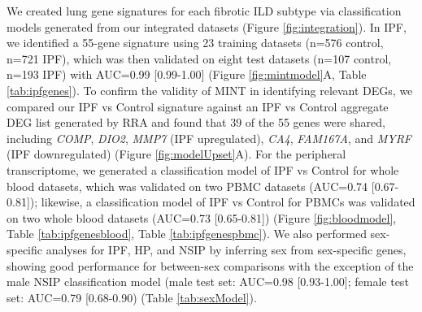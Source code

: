 \documentclass[
]{article}
\begin{document}
We created lung gene signatures for each fibrotic ILD subtype via classification models generated from our integrated datasets (Figure \ref{fig:integration}). In IPF, we identified a 55-gene signature using 23 training datasets (n=576 control, n=721 IPF), which was then validated on eight test datasets (n=107 control, n=193 IPF) with AUC=0.99 {[}0.99-1.00{]} (Figure \ref{fig:mintmodel}A, Table \ref{tab:ipfgenes}). To confirm the validity of MINT in identifying relevant DEGs, we compared our IPF vs Control signature against an IPF vs Control aggregate DEG list generated by RRA and found that 39 of the 55 genes were shared, including \textit{COMP}, \textit{DIO2}, \textit{MMP7} (IPF upregulated), \textit{CA4}, \textit{FAM167A}, and \textit{MYRF} (IPF downregulated) (Figure \ref{fig:modelUpset}A). For the peripheral transcriptome, we generated a classification model of IPF vs Control for whole blood datasets, which was validated on two PBMC datasets (AUC=0.74 {[}0.67-0.81{]}); likewise, a classification model of IPF vs Control for PBMCs was validated on two whole blood datasets (AUC=0.73 {[}0.65-0.81{]}) (Figure \ref{fig:bloodmodel}, Table \ref{tab:ipfgenesblood}, Table \ref{tab:ipfgenespbmc}). We also performed sex-specific analyses for IPF, HP, and NSIP by inferring sex from sex-specific genes, showing good performance for between-sex comparisons with the exception of the male NSIP classification model (male test set: AUC=0.98 {[}0.93-1.00{]}; female test set: AUC=0.79 {[}0.68-0.90) (Table \ref{tab:sexModel}).

\newpage





































\captionsetup{width=6.5in}
\end{document}
